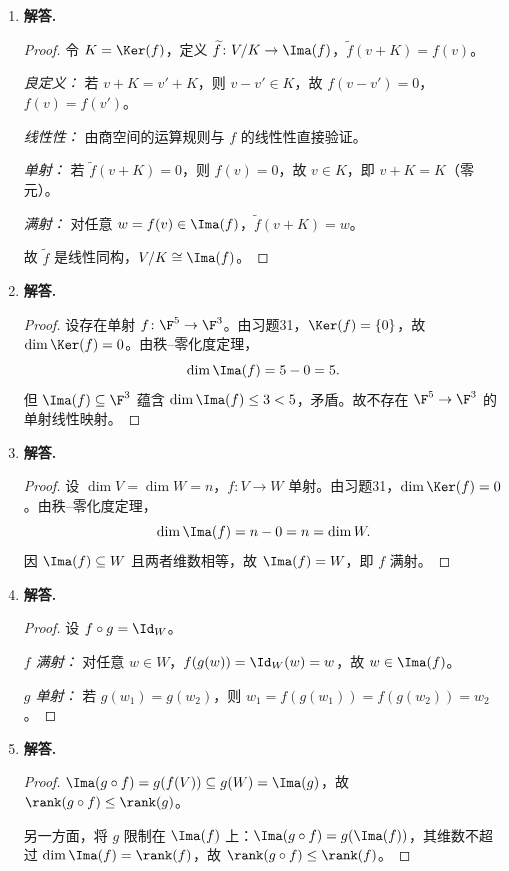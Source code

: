 \begin{enumerate}[label=\textbf{\arabic*.}, leftmargin=*, itemsep=1em]
\begin{proof}
$(\Leftarrow)$ 若 $\Ima(f)=W$，则对任意 $w\in W$ 存在 $v$ 使 $f(v)=w$，即 $f$ 满射。
\end{proof}

\item \textbf{解答.}
\begin{proof}
令 $K=\Ker(f)$，定义 $\widetilde{f}\colon V/K\to\Ima(f)$，$\widetilde{f}(v+K)=f(v)$。

\emph{良定义：} 若 $v+K=v'+K$，则 $v-v'\in K$，故 $f(v-v')=0$，$f(v)=f(v')$。

\emph{线性性：} 由商空间的运算规则与 $f$ 的线性性直接验证。

\emph{单射：} 若 $\widetilde{f}(v+K)=0$，则 $f(v)=0$，故 $v\in K$，即 $v+K=K$（零元）。

\emph{满射：} 对任意 $w=f(v)\in\Ima(f)$，$\widetilde{f}(v+K)=w$。

故 $\widetilde{f}$ 是线性同构，$V/K\cong\Ima(f)$。
\end{proof}

\item \textbf{解答.}
\begin{proof}
设存在单射 $f\colon\F^5\to\F^3$。由习题31，$\Ker(f)=\{0\}$，故 $\dim\Ker(f)=0$。由秩--零化度定理，
\[
  \dim\Ima(f)=5-0=5.
\]
但 $\Ima(f)\subseteq\F^3$ 蕴含 $\dim\Ima(f)\le 3 < 5$，矛盾。故不存在 $\F^5\to\F^3$ 的单射线性映射。
\end{proof}

\item \textbf{解答.}
\begin{proof}
设 $\dim V=\dim W=n$，$f\colon V\to W$ 单射。由习题31，$\dim\Ker(f)=0$。由秩--零化度定理，
\[
  \dim\Ima(f)=n-0=n=\dim W.
\]
因 $\Ima(f)\subseteq W$ 且两者维数相等，故 $\Ima(f)=W$，即 $f$ 满射。
\end{proof}

\item \textbf{解答.}
\begin{proof}
设 $f\circ g=\Id_W$。

\emph{$f$ 满射：} 对任意 $w\in W$，$f(g(w))=\Id_W(w)=w$，故 $w\in\Ima(f)$。

\emph{$g$ 单射：} 若 $g(w_1)=g(w_2)$，则 $w_1=f(g(w_1))=f(g(w_2))=w_2$。
\end{proof}

\item \textbf{解答.}
\begin{proof}
$\Ima(g\circ f)=g(f(V))\subseteq g(W)=\Ima(g)$，故 $\rank(g\circ f)\le\rank(g)$。

另一方面，将 $g$ 限制在 $\Ima(f)$ 上：$\Ima(g\circ f)=g(\Ima(f))$，其维数不超过 $\dim\Ima(f)=\rank(f)$，故 $\rank(g\circ f)\le\rank(f)$。


\end{proof}
\end{enumerate}
